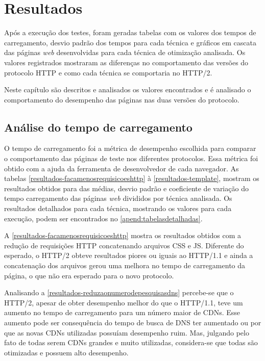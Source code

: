 %
%

\chapter{Resultados}

Após a execução dos testes, foram geradas tabelas com os valores dos tempos de carregamento, desvio padrão dos tempos para cada técnica e gráficos em cascata das páginas \textit{web} desenvolvidas para cada técnica de otimização analisada. Os valores registrados mostraram as diferenças no comportamento das versões do protocolo HTTP e como cada técnica se comportaria no HTTP/2.

Neste capítulo são descritos e analisados os valores encontrados e é analisado o comportamento do desempenho das páginas nas duas versões do protocolo.

\section{Análise do tempo de carregamento}
\label{analisedotempodecarregamento}

O tempo de carregamento foi a métrica de desempenho escolhida para comparar o comportamento das páginas de teste nos diferentes protocolos. Essa métrica foi obtido com a ajuda da ferramenta de desenvolvedor de cada navegador. As tabelas \ref{resultados-facamenosrequisicoeshttp} à \ref{resultados-template}, mostram os resultados obtidos para das médias, desvio padrão e coeficiente de variação do tempo carregamento das páginas \textit{web} divididos por técnica analisada. Os resultados detalhados para cada técnica, mostrando os valores para cada execução, podem ser encontrados no \autoref{apend:tabelasdetalhadas}.



A \autoref{resultados-facamenosrequisicoeshttp} mostra os resultados obtidos com a redução de requisições HTTP concatenando arquivos CSS e JS. Diferente do esperado, o HTTP/2 obteve resultados piores ou iguais ao HTTP/1.1 e ainda a concatenação dos arquivos gerou uma melhora no tempo de carregamento da página, o que não era esperado para o novo protocolo.



Analisando a \autoref{resultados-reduzaonumerodepesquisasdns} percebe-se que o HTTP/2, apesar de obter desempenho melhor do que o HTTP/1.1, teve um aumento no tempo de carregamento para um número maior de CDNs. Esse aumento pode ser consequência do tempo de busca de DNS ter aumentado ou por que as novas CDNs utilizadas possuíam desempenho ruim. Mas, julgando pelo fato de todas serem CDNs grandes e muito utilizadas, considera-se que todas são otimizadas e possuem alto desempenho. 

